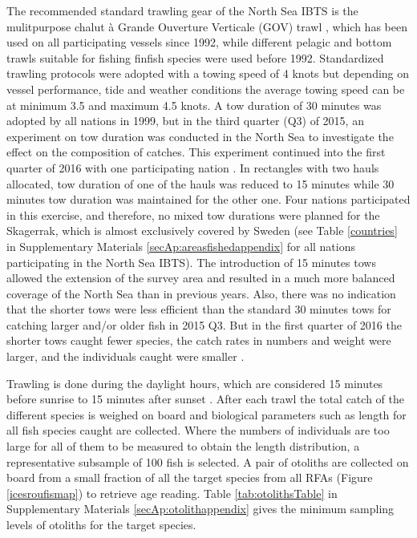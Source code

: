 \documentclass[a4paper 12pt]{article}
\numberwithin{equation}{section}
\begin{document}
The recommended standard trawling gear of the North Sea IBTS is the mulitpurpose chalut {\`a} Grande Ouverture Verticale (GOV) trawl \citep{ICES2012}, which has been used on all participating vessels since 1992, while different pelagic and bottom trawls suitable for fishing finfish species were used before 1992. Standardized trawling protocols were adopted with a towing speed of 4 knots but depending on vessel performance, tide and weather conditions the average towing speed can be at minimum 3.5 and maximum 4.5 knots. A tow duration of 30 minutes was adopted by all nations in 1999, but in the third quarter (Q3) of 2015, an experiment on tow duration was conducted in the North Sea to investigate the effect on the composition of catches. This experiment continued into the first quarter of 2016 with one participating nation \citep{ICES2016c}.  In rectangles with two hauls allocated, tow duration of one of the hauls was reduced to 15 minutes while 30 minutes tow duration was maintained for the other one. Four nations  participated in this exercise, and therefore, no mixed tow durations were planned for the Skagerrak, which is almost exclusively covered by Sweden (see Table \ref{countries} in Supplementary Materials \ref{secAp:areasfishedappendix} for all nations participating in the North Sea IBTS). The introduction of 15 minutes tows allowed the extension of the survey area and resulted in a much more balanced coverage of the North Sea than in previous years. Also, there was no indication that the shorter tows were less efficient than the standard 30 minutes tows for catching larger and/or older fish in 2015 Q3. But in the first quarter of 2016 the shorter tows caught fewer species, the catch rates in numbers and weight were larger, and the individuals caught were smaller  \citep[see][]{ICES2016c}. 

Trawling is done during the daylight hours, which are considered 15 minutes before sunrise to 15 minutes  after sunset \citep{ICES2012}. After each trawl the total catch of the different species is weighed on board and biological parameters such as length for all fish species caught are collected. Where the numbers of individuals are too large for all of them  to be measured to obtain the length distribution, a representative subsample of 100 fish is selected. A pair of otoliths are collected on board from a small fraction of all the target species from all RFAs (Figure \ref{icesroufismap}) to retrieve age reading. Table \ref{tab:otolithsTable} in Supplementary Materials \ref{secAp:otolithappendix} gives the minimum sampling levels of otoliths for the target species.
 
\end{document}
